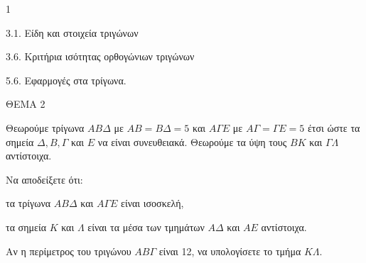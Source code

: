 \begin{ylh}{1}
    \item 3.1. Είδη και στοιχεία τριγώνων
    \item 3.6. Κριτήρια ισότητας ορθογώνιων τριγώνων
    \item 5.6. Εφαρμογές στα τρίγωνα.
\end{ylh}

ΘΕΜΑ 2

Θεωρούμε τρίγωνα $AB\Delta$ με $AB = B\Delta = 5$ και $A\Gamma E$ με $A\Gamma = \Gamma E = 5$ έτσι ώστε τα σημεία $\Delta, B, \Gamma$ και $E$ να είναι συνευθειακά. Θεωρούμε τα ύψη τους $BK$ και $\Gamma \Lambda$ αντίστοιχα.

\begin{alist}
\item Να αποδείξετε ότι:
\begin{alist}
\item τα τρίγωνα $AB\Delta$ και $A\Gamma E$ είναι ισοσκελή, 
\item τα σημεία $K$ και $\Lambda$ είναι τα μέσα των τμημάτων $A\Delta$ και $AE$ αντίστοιχα. 
\end{alist}
\item Αν η περίμετρος του τριγώνου $AB\Gamma$ είναι 12, να υπολογίσετε το τμήμα $K\Lambda$. 

\begin{center}
\end{center}
\end{alist}
